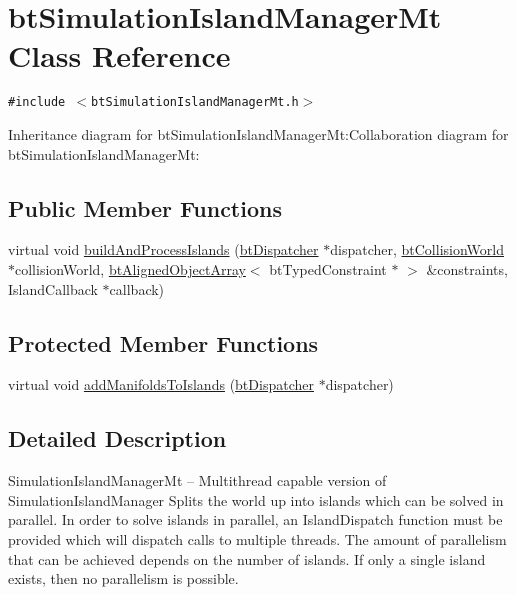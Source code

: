 \hypertarget{classbt_simulation_island_manager_mt}{
\section{btSimulationIslandManagerMt Class Reference}
\label{classbt_simulation_island_manager_mt}
}
{\tt \#include $<$btSimulationIslandManagerMt.h$>$}

Inheritance diagram for btSimulationIslandManagerMt:Collaboration diagram for btSimulationIslandManagerMt:\subsection*{Public Member Functions}
\begin{CompactItemize}
\item 
virtual void \hyperlink{classbt_simulation_island_manager_mt_9be20c991c57ec972eb33a160d6276fd}{buildAndProcessIslands} (\hyperlink{classbt_dispatcher}{btDispatcher} $\ast$dispatcher, \hyperlink{classbt_collision_world}{btCollisionWorld} $\ast$collisionWorld, \hyperlink{classbt_aligned_object_array}{btAlignedObjectArray}$<$ btTypedConstraint $\ast$ $>$ \&constraints, IslandCallback $\ast$callback)
\end{CompactItemize}
\subsection*{Protected Member Functions}
\begin{CompactItemize}
\item 
virtual void \hyperlink{classbt_simulation_island_manager_mt_77eadf262f5a0e63053e3efcc9ccfec9}{addManifoldsToIslands} (\hyperlink{classbt_dispatcher}{btDispatcher} $\ast$dispatcher)
\end{CompactItemize}


\subsection{Detailed Description}
SimulationIslandManagerMt -- Multithread capable version of SimulationIslandManager Splits the world up into islands which can be solved in parallel. In order to solve islands in parallel, an IslandDispatch function must be provided which will dispatch calls to multiple threads. The amount of parallelism that can be achieved depends on the number of islands. If only a single island exists, then no parallelism is possible. 

